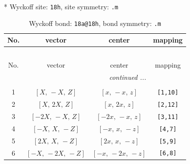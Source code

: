 \documentclass[fleqn,8pt]{jsarticle}
\begin{document}
* Wyckoff site: {\tt 18h}, site symmetry: {\tt .m}
\renewcommand{\arraystretch}{1.2}
\begin{longtable}{cccc}
\caption{Wyckoff bond: {\tt 18a@18h}, bond symmetry: {\tt .m}}
 \\
 \hline \hline
No. & vector & center & mapping \\ \hline \endfirsthead

\multicolumn{3}{l}{\tablename\ \thetable{}} \\
 \hline \hline
No. & vector & center & mapping \\ \hline \endhead

 \hline \hline
\multicolumn{3}{r}{\footnotesize\it continued ...} \\ \endfoot

 \hline \hline
\multicolumn{3}{r}{} \\ \endlastfoot

1 & $\left[ X,\, - X,\, Z \right]$ & $\left[ x,\, - x,\, z \right]$ & {\tt [1,10]} \\ \hline
2 & $\left[ X,\, 2 X,\, Z \right]$ & $\left[ x,\, 2 x,\, z \right]$ & {\tt [2,12]} \\ \hline
3 & $\left[ - 2 X,\, - X,\, Z \right]$ & $\left[ - 2 x,\, - x,\, z \right]$ & {\tt [3,11]} \\ \hline
4 & $\left[ - X,\, X,\, - Z \right]$ & $\left[ - x,\, x,\, - z \right]$ & {\tt [4,7]} \\ \hline
5 & $\left[ 2 X,\, X,\, - Z \right]$ & $\left[ 2 x,\, x,\, - z \right]$ & {\tt [5,9]} \\ \hline
6 & $\left[ - X,\, - 2 X,\, - Z \right]$ & $\left[ - x,\, - 2 x,\, - z \right]$ & {\tt [6,8]} \\
\end{longtable}
\renewcommand{\arraystretch}{1.2}
\end{document}
